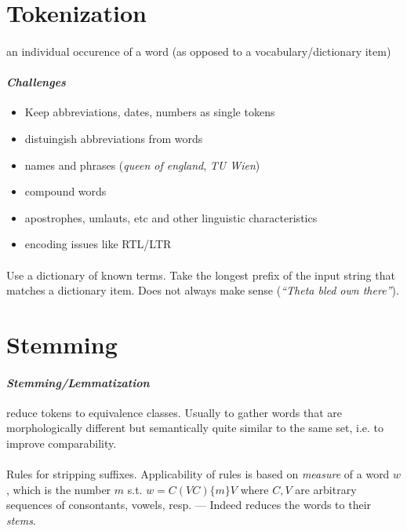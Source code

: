 \documentclass[10pt,twocolumn]{article}
\begin{document}
\section{Tokenization}
 
\paragraph{} an individual occurence of a word (as opposed to a
vocabulary/dictionary item)

\paragraph{\textit{Challenges}}
\begin{itemize}
\item Keep abbreviations, dates, numbers as single tokens
\item distuingish abbreviations from words
\item names and phrases (\textit{queen of england}, \textit{TU Wien})
\item compound words
\item apostrophes, umlauts, etc and other linguistic characteristics
\item encoding issues like RTL/LTR
\end{itemize}

\paragraph{} Use a dictionary of known terms.
Take the longest prefix of the input string that matches a dictionary item. Does
not always make sense (\textit{``Theta bled own there''}).

\section{Stemming}

\paragraph{\textit{Stemming/Lemmatization}} reduce tokens to equivalence
classes. Usually to gather words that are morphologically different but
semantically quite similar to the same set, i.e. to improve comparability. 

\paragraph{ } Rules for stripping suffixes. Applicability of
rules is based on \textit{measure} of a word $w$, which is the number $m$ s.t.
$w=C(VC)\{m\}V$ where $C,V$ are arbitrary sequences of consontants, vowels,
resp. --- Indeed reduces the words to their \textit{stems}.
\end{document}
